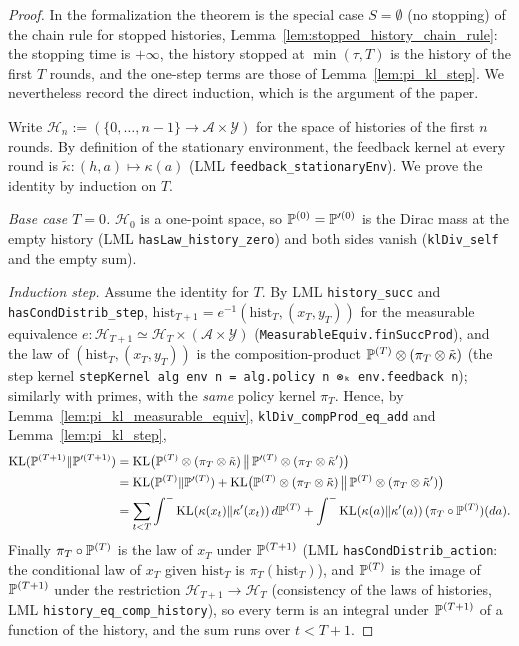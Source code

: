 \begin{proof}
\leanok
{}
In the formalization the theorem is the special case $S = \emptyset$ (no stopping) of the chain
rule for stopped histories, Lemma~\ref{lem:stopped_history_chain_rule}: the stopping time is
$+\infty$, the history stopped at $\min(\tau, T)$ is the history of the first $T$ rounds, and the
one-step terms are those of Lemma~\ref{lem:pi_kl_step}. We nevertheless record the direct
induction, which is the argument of the paper.

Write $\mathcal{H}_n := (\{0,\dots,n-1\} \to \mathcal{A}\times\mathcal{Y})$ for the space of
histories of the first $n$ rounds. By definition of the stationary environment, the feedback
kernel at every round is $\tilde\kappa : (h,a)\mapsto\kappa(a)$ (LML
\texttt{feedback\_stationaryEnv}). We prove the identity by induction on $T$.

\emph{Base case $T = 0$.} $\mathcal{H}_0$ is a one-point space, so $\mathbb{P}^{(0)} = \mathbb{P}'^{(0)}$
is the Dirac mass at the empty history (LML \texttt{hasLaw\_history\_zero}) and both sides
vanish (\texttt{klDiv\_self} and the empty sum).

\emph{Induction step.} Assume the identity for $T$. By LML \texttt{history\_succ} and
\texttt{hasCondDistrib\_step}, $\mathrm{hist}_{T+1} = e^{-1}(\mathrm{hist}_T, (x_T,y_T))$
for the measurable equivalence $e : \mathcal{H}_{T+1}\simeq\mathcal{H}_T\times(\mathcal{A}\times\mathcal{Y})$
(\texttt{MeasurableEquiv.finSuccProd}), and the law of $(\mathrm{hist}_T,(x_T,y_T))$ is
the composition-product $\mathbb{P}^{(T)}\otimes(\pi_T\otimes\tilde\kappa)$ (the step kernel
\texttt{stepKernel alg env n = alg.policy n ⊗ₖ env.feedback n}); similarly with primes, with
the \emph{same} policy kernel $\pi_T$. Hence, by Lemma~\ref{lem:pi_kl_measurable_equiv},
\texttt{klDiv\_compProd\_eq\_add} and Lemma~\ref{lem:pi_kl_step},
\begin{align*}
  \mathrm{KL}(\mathbb{P}^{(T+1)}\|\mathbb{P}'^{(T+1)})
  &= \mathrm{KL}\big(\mathbb{P}^{(T)}\otimes(\pi_T\otimes\tilde\kappa)\,\big\|\,\mathbb{P}'^{(T)}\otimes(\pi_T\otimes\tilde\kappa')\big)\\
  &= \mathrm{KL}(\mathbb{P}^{(T)}\|\mathbb{P}'^{(T)})
     + \mathrm{KL}\big(\mathbb{P}^{(T)}\otimes(\pi_T\otimes\tilde\kappa)\,\big\|\,\mathbb{P}^{(T)}\otimes(\pi_T\otimes\tilde\kappa')\big)\\
  &= \sum_{t<T}\int^-\mathrm{KL}(\kappa(x_t)\|\kappa'(x_t))\,d\mathbb{P}^{(T)}
     + \int^-\mathrm{KL}(\kappa(a)\|\kappa'(a))\,(\pi_T\circ\mathbb{P}^{(T)})(da).
\end{align*}
Finally $\pi_T\circ\mathbb{P}^{(T)}$ is the law of $x_T$ under $\mathbb{P}^{(T+1)}$ (LML
\texttt{hasCondDistrib\_action}: the conditional law of $x_T$ given $\mathrm{hist}_T$ is
$\pi_T(\mathrm{hist}_T)$), and $\mathbb{P}^{(T)}$ is the image of $\mathbb{P}^{(T+1)}$ under the restriction
$\mathcal{H}_{T+1}\to\mathcal{H}_T$ (consistency of the laws of histories, LML
\texttt{history\_eq\_comp\_history}), so every term is an integral under $\mathbb{P}^{(T+1)}$ of a
function of the history, and the sum runs over $t < T+1$.


\end{proof}

